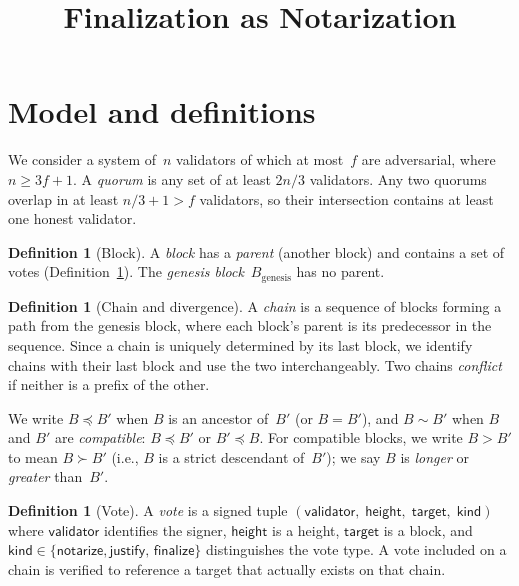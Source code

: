 \ifx\litemode\undefined\documentclass{article}\fi
\title{Finalization as Notarization}
\newcommand{\target}{\mathsf{target}}
\newcommand{\kind}{\mathsf{kind}}
\newcommand{\height}{\mathsf{height}}
\newcommand{\finalize}{\mathsf{finalize}}
\newcommand{\validator}{\mathsf{validator}}
\newcommand{\justify}{\mathsf{justify}}
\newcommand{\notarize}{\mathsf{notarize}}
\theoremstyle{plain}
\theoremstyle{definition}
\newtheorem{definition}[theorem]{Definition}
\theoremstyle{remark}
\begin{document}
\maketitle

\section{Model and definitions}

We consider a system of~$n$ validators of which at most~$f$ are adversarial, where $n \geq 3f + 1$.
A \emph{quorum} is any set of at least $2n/3$ validators.
Any two quorums overlap in at least $n/3 + 1 > f$ validators, so their intersection contains at least one honest validator.

\begin{definition}[Block]\label{def:block}
A \emph{block} has a \emph{parent} (another block) and contains a set of votes (Definition~\ref{def:vote}).
The \emph{genesis block}~$B_{\mathrm{genesis}}$ has no parent.
\end{definition}

\begin{definition}[Chain and divergence]\label{def:chain}
A \emph{chain} is a sequence of blocks forming a path from the genesis block, where each block's parent is its predecessor in the sequence.
Since a chain is uniquely determined by its last block, we identify chains with their last block and use the two interchangeably.
Two chains \emph{conflict} if neither is a prefix of the other.
\end{definition}

We write $B \preceq B'$ when $B$ is an ancestor of~$B'$ (or $B = B'$), and $B \sim B'$ when $B$ and $B'$ are \emph{compatible}: $B \preceq B'$ or $B' \preceq B$.
For compatible blocks, we write $B > B'$ to mean $B \succ B'$ (i.e., $B$ is a strict descendant of~$B'$); we say $B$ is \emph{longer} or \emph{greater} than~$B'$.

\begin{definition}[Vote]\label{def:vote}
A \emph{vote} is a signed tuple $(\validator,\; \height,\; \target,\; \kind)$ where $\validator$ identifies the signer, $\height$ is a height, $\target$ is a block, and $\kind \in \{\notarize, \justify,\, \finalize\}$ distinguishes the vote type.
A vote included on a chain is verified to reference a target that actually exists on that chain.
\end{definition}
\end{document}
